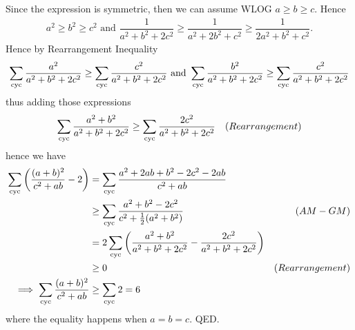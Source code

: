 
\begin{solusi}
    Since the expression is symmetric, then we can assume WLOG $a \ge b \ge c$. Hence
    \begin{align*}
        a^2 \ge b^2 \ge c^2  \text{ and }
        \dfrac{1}{a^2+b^2+2c^2} \ge \dfrac{1}{a^2+2b^2+c^2} \ge \dfrac{1}{2a^2+b^2+c^2}.
    \end{align*}
    Hence by Rearrangement Inequality
    \begin{align*}
        \sum_{\mathrm{cyc}} \dfrac{a^2}{a^2+b^2+2c^2} \ge  \sum_{\mathrm{cyc}} \dfrac{c^2}{a^2+b^2+2c^2} \text{ and }
        \sum_{\mathrm{cyc}} \dfrac{b^2}{a^2+b^2+2c^2} \ge  \sum_{\mathrm{cyc}} \dfrac{c^2}{a^2+b^2+2c^2}
    \end{align*}
    thus adding those expressions
    \begin{align*}
        \sum_{\mathrm{cyc}} \dfrac{a^2+b^2}{a^2+b^2+2c^2} &\ge \sum_{\mathrm{cyc}} \dfrac{2c^2}{a^2+b^2+2c^2} & (Rearrangement)
    \end{align*}   
    hence we have
    \begin{align*}
        \sum_{\mathrm{cyc}}\left( \dfrac{(a+b)^2}{c^2+ab} - 2\right)
        &= \sum_{\mathrm{cyc}} \dfrac{a^2+2ab+b^2-2c^2-2ab}{c^2+ab}\\
        &\ge \sum_{\mathrm{cyc}} \dfrac{a^2+b^2-2c^2}{c^2+\frac{1}{2}(a^2+b^2)} & (AM-GM)\\
        &= 2\sum_{\mathrm{cyc}} \left(\dfrac{a^2+b^2}{a^2+b^2+2c^2} - \dfrac{2c^2}{a^2+b^2+2c^2}\right)\\
        &\ge 0 & (Rearrangement) \\
        \implies \sum_{\mathrm{cyc}}\dfrac{(a+b)^2}{c^2+ab} &\ge \sum_{\mathrm{cyc}} 2 = 6
    \end{align*}
    where the equality happens when $a=b=c$. QED.
\end{solusi}